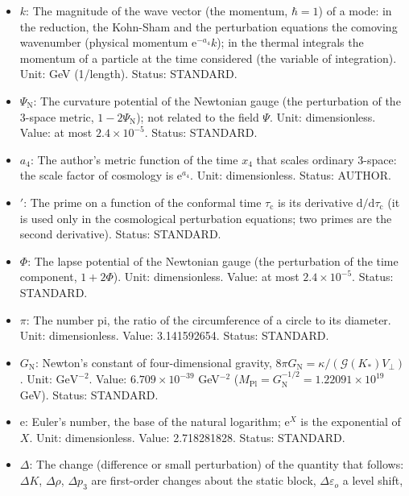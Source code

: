 \documentclass[
  10pt,
]{article}
\providecommand{\tightlist}{%
  \setlength{\itemsep}{0pt}\setlength{\parskip}{0pt}}
\begin{document}
\begin{itemize}
\tightlist
\item
  \(k\): The magnitude of the wave vector (the momentum, \(\hbar = 1\))
  of a mode: in the reduction, the Kohn-Sham and the perturbation
  equations the comoving wavenumber (physical momentum
  \(\mathrm{e}^{-a_4}k\)); in the thermal integrals the momentum of a
  particle at the time considered (the variable of integration). Unit:
  GeV (1/length). Status: STANDARD.
\item
  \(\Psi_{\mathrm{N}}\): The curvature potential of the Newtonian gauge
  (the perturbation of the 3-space metric, \(1 - 2\Psi_{\mathrm{N}}\));
  not related to the field \(\Psi\). Unit: dimensionless. Value: at most
  \(2.4\times10^{-5}\). Status: STANDARD.
\item
  \(a_4\): The author's metric function of the time \(x_4\) that scales
  ordinary 3-space: the scale factor of cosmology is
  \(\mathrm{e}^{a_4}\). Unit: dimensionless. Status: AUTHOR.
\item
  \({}'\): The prime on a function of the conformal time
  \(\tau_{\mathrm{c}}\) is its derivative
  \(\mathrm{d}/\mathrm{d}\tau_{\mathrm{c}}\) (it is used only in the
  cosmological perturbation equations; two primes are the second
  derivative). Status: STANDARD.
\item
  \(\Phi\): The lapse potential of the Newtonian gauge (the perturbation
  of the time component, \(1 + 2\Phi\)). Unit: dimensionless. Value: at
  most \(2.4\times10^{-5}\). Status: STANDARD.
\item
  \(\pi\): The number pi, the ratio of the circumference of a circle to
  its diameter. Unit: dimensionless. Value: 3.141592654. Status:
  STANDARD.
\item
  \(G_{\mathrm{N}}\): Newton's constant of four-dimensional gravity,
  \(8\pi G_{\mathrm{N}} = \kappa/(\mathcal{G}(K_*)V_\perp)\). Unit:
  \(\mathrm{GeV}^{-2}\). Value: \(6.709\times10^{-39}\) GeV\(^{-2}\)
  (\(M_{\mathrm{Pl}} = G_{\mathrm{N}}^{-1/2} = 1.22091\times10^{19}\)
  GeV). Status: STANDARD.
\item
  \(\mathrm{e}\): Euler's number, the base of the natural logarithm;
  \(\mathrm{e}^{X}\) is the exponential of \(X\). Unit: dimensionless.
  Value: 2.718281828. Status: STANDARD.
\item
  \(\Delta\): The change (difference or small perturbation) of the
  quantity that follows: \(\Delta K\), \(\Delta\rho\), \(\Delta p_3\)
  are first-order changes about the static block,
  \(\Delta\varepsilon_o\) a level shift,

\end{itemize}
\end{document}
